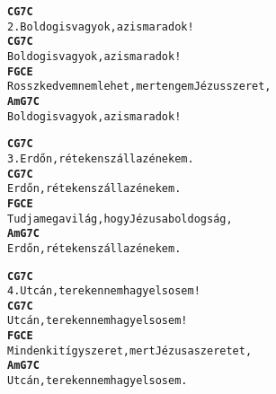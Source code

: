 \newpage
{}
\kottastart
{}
\kottaend
\begin{minipage}{\textwidth}
\begin{alltt}
\textbf{    C                G7         C}
2. Boldog is vagyok, az is maradok!
\textbf{    C                G7         C}
   Boldog is vagyok, az is maradok!
\textbf{    F            G          C          E}
   Rossz kedvem nem lehet, mert engem Jézus szeret,
\textbf{    Am           G7             C}
   Boldog is vagyok, az is maradok!
\end{alltt}
\vspace{0.0cm}
\versszakspacing
\end{minipage}
\begin{minipage}{\textwidth}
\begin{alltt}
\textbf{   C                G7         C}
3. Erdőn, réteken száll az énekem.
\textbf{   C                G7         C}
   Erdőn, réteken száll az énekem.
\textbf{    F        G         C         E}
   Tudja meg a világ, hogy Jézus a boldogság,
\textbf{   Am          G7              C}
   Erdőn, réteken száll az énekem.
\end{alltt}
\vspace{0.0cm}
\versszakspacing
\end{minipage}
\begin{minipage}{\textwidth}
\begin{alltt}
\textbf{   C               G7            C}
4. Utcán, tereken nem hagy el sosem!
\textbf{   C               G7            C}
   Utcán, tereken nem hagy el sosem!
\textbf{    F        G            C         E}
   Mindenkit így szeret, mert Jézus a szeretet,
\textbf{   Am          G7              C}
   Utcán, tereken nem hagy el sosem.
\end{alltt}
\vspace{0.0cm}
\versszakspacing
\end{minipage}
